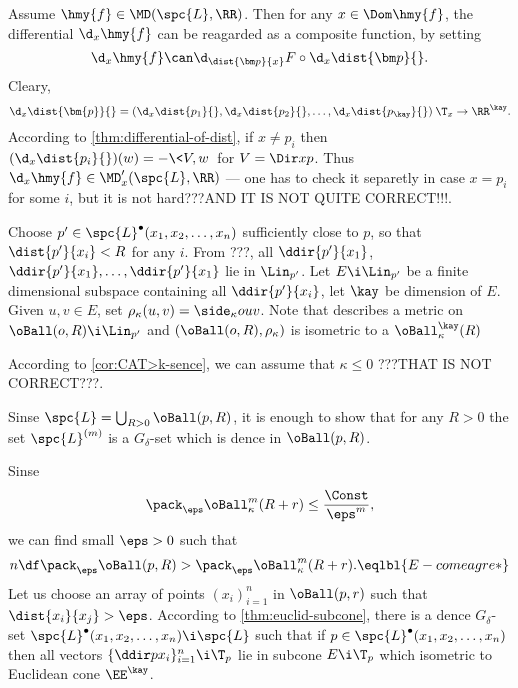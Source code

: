 Assume $\hmy{f}\in\MD(\spc{L},\RR)$.
Then for any $x\in\Dom\hmy{f}$,
the differential $\d_x\hmy{f}$ can be reagarded as a composite function, by setting
$$\d_x \hmy{f}
\can
\d_{\dist{\bm p}{x}} F\circ\d_{x}\dist{\bm p}{}.$$
Cleary,
$$\d_x\dist{\bm{p}}{}=(\d_x\dist{p_1}{},\d_x\dist{p_2}{},\dots,\d_x\dist{p_\kay}{})\:\T_x\to\RR^\kay.$$
According to \ref{thm:differential-of-dist}, if $x\not=p_i$ then $(\d_x\dist{p_i}{})(w)=-\<V,w\>$ for $V=\Dir xp$.
Thus $\d_x\hmy{f}\in\MD'_x(\spc{L},\RR)$ --- one has to check it separetly in case $x=p_i$ for some $i$, but it is not hard???AND IT IS NOT QUITE CORRECT!!!.



















 

Choose $p'\in\spc{L}^\bullet(x_1,x_2,\dots,x_n)$ sufficiently close to $p$, so that $\dist{p'}{x_i}<R$ for any $i$.
From ???, all 
$\ddir{p'}{x_1}$, $\ddir{p'}{x_1},\dots,\ddir{p'}{x_1}$ lie in $\Lin_{p'}$.
Let $E\i \Lin_{p'}$ be a finite dimensional subspace containing all $\ddir{p'}{x_i}$,
let $\kay$ be dimension of $E$.
Given $u,v\in E$,
set $\rho_\kappa(u,v)=\side_\kappa{o}{u}{v}$.
Note that describes a metric on $\oBall(o,R)\i\Lin_{p'}$ and $(\oBall(o,R),\rho_\kappa)$ is isometric to a $\oBall^\kay_\kappa(R)$

According to \ref{cor:CAT>k-sence}, we can assume that $\kappa\le 0$ ???THAT IS NOT CORRECT???.

Sinse $\spc{L}=\bigcup_{R>0}\oBall(p,R)$, 
it is enough to show that for any $R>0$ the set $\spc{L}^{(m)}$ is a $G_\delta$-set which is dence in $\oBall(p,R)$.

Sinse 
$$\pack_\eps \oBall^{m}_\kappa(R+r)\le \frac{\Const}{\eps^m},$$ 
we can find small $\eps>0$ such that 
$$n\df\pack_{\eps} \oBall(p,R)>\pack_{\eps} \oBall^{m}_\kappa(R+r).
\eqlbl{E-comeagre*}$$
Let us choose an array of points $(x_i)_{i=1}^n$ in $\oBall(p,r)$ such that $\dist{x_i}{x_j}>\eps$.
According to \ref{thm:euclid-subcone}, there is a dence $G_\delta$-set $\spc{L}^\bullet(x_1,x_2,\dots,x_n)\i \spc{L}$ such that if $p\in \spc{L}^\bullet(x_1,x_2,\dots,x_n)$ then all vectors $\{\ddir p{x_i}\}_{i=1}^n\i \T_p$ lie in subcone $E\i \T_p$ which isometric to Euclidean cone $\EE^{\kay}$.

